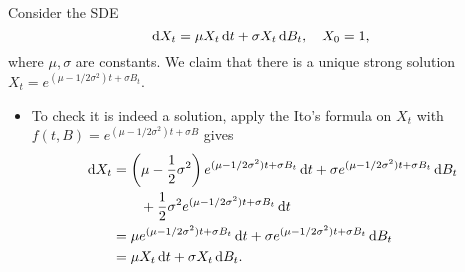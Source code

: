 \begin{example}
Consider the SDE
\[
\,\mathrm{d} X_t = \mu X_t\,\mathrm{d} t + \sigma X_t\,\mathrm{d} B_t,\quad X_0=1,
\]
where $\mu,\sigma$ are constants. We claim that there is a unique strong solution $X_t=e^{(\mu-1/2\sigma^2)t + \sigma B_t}$.
\begin{itemize}
\item
To check it is indeed a solution, apply the Ito's formula on $X_t$ with $f(t,B)=e^{(\mu-1/2\sigma^2)t + \sigma B}$ gives
\begin{align*}
\,\mathrm{d} X_t&=\left(
\mu - \frac{1}{2}\sigma^2
\right)e^{(\mu-1/2\sigma^2)t + \sigma B_t}\,\mathrm{d} t +  
\sigma e^{(\mu-1/2\sigma^2)t + \sigma B_t}\,\mathrm{d} B_t\\
&\qquad + \frac{1}{2}\sigma^2e^{(\mu-1/2\sigma^2)t + \sigma B_t}\,\mathrm{d} t\\
&=\mu e^{(\mu-1/2\sigma^2)t + \sigma B_t}\,\mathrm{d} t + \sigma e^{(\mu-1/2\sigma^2)t + \sigma B_t}\,\mathrm{d} B_t\\
&=\mu X_t\,\mathrm{d} t + \sigma X_t\,\mathrm{d} B_t.
\end{align*}
\end{itemize}
\end{example}


